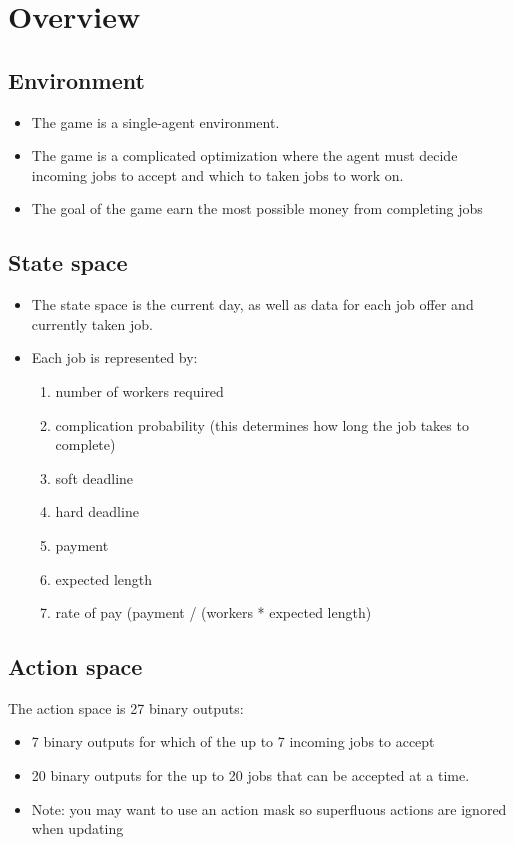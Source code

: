 \documentclass[11pt]{article}
\author{Kevin James}
\date{\today}
\title{}
\begin{document}
\section{Overview}
\label{sec:orgd2f8ce6}
\subsection{Environment}
\label{sec:orgc38f51d}
\begin{itemize}
\item The game is a single-agent environment.
\item The game is a complicated optimization where the agent must decide incoming jobs to accept and which to taken jobs to work on.
\item The goal of the game earn the most possible money from completing jobs
\end{itemize}
\subsection{State space}
\label{sec:org69b3ddf}
\begin{itemize}
\item The state space is the current day, as well as data for each job offer and currently taken job.
\item Each job is represented by:
\begin{enumerate}
\item number of workers required
\item complication probability (this determines how long the job takes to complete)
\item soft deadline
\item hard deadline
\item payment
\item expected length
\item rate of pay (payment / (workers * expected length)
\end{enumerate}
\end{itemize}
\subsection{Action space}
\label{sec:org92fa457}
The action space is 27 binary outputs:
\begin{itemize}
\item 7 binary outputs for which of the up to 7 incoming jobs to accept
\item 20 binary outputs for the up to 20 jobs that can be accepted at a time.
\item Note: you may want to use an action mask so superfluous actions are ignored when updating
\end{itemize}
\end{document}
